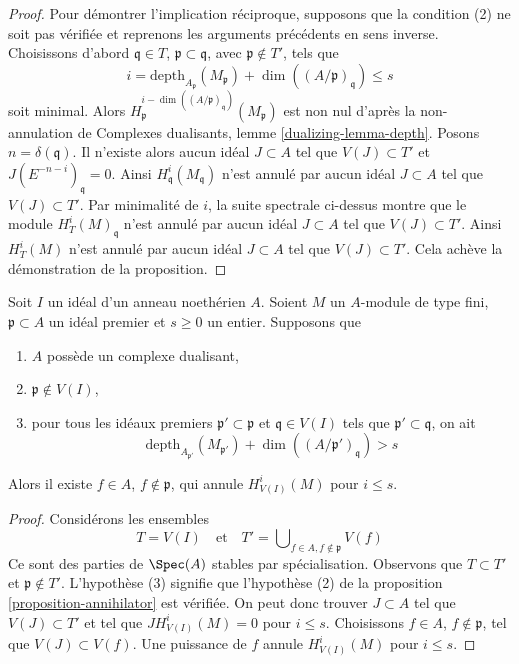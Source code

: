 \begin{proof}
\medskip\noindent
Pour démontrer l'implication réciproque, supposons que la condition (2) ne soit pas vérifiée et reprenons les arguments précédents en sens inverse. Choisissons d'abord $\mathfrak q \in T$, $\mathfrak p \subset \mathfrak q$, avec $\mathfrak p \not \in T'$, tels que
$$
i = \text{depth}_{A_\mathfrak p}(M_\mathfrak p) +
\dim((A/\mathfrak p)_\mathfrak q) \leq s
$$
soit minimal. Alors $H^{i - \dim((A/\mathfrak p)_\mathfrak q)}_\mathfrak p(M_\mathfrak p)$ est non nul d'après la non-annulation de Complexes dualisants, lemme \ref{dualizing-lemma-depth}. Posons $n = \delta(\mathfrak q)$. Il n'existe alors aucun idéal $J \subset A$ tel que $V(J) \subset T'$ et $J(E^{-n - i})_\mathfrak q = 0$. Ainsi $H^i_\mathfrak q(M_\mathfrak q)$ n'est annulé par aucun idéal $J \subset A$ tel que $V(J) \subset T'$. Par minimalité de $i$, la suite spectrale ci-dessus montre que le module $H^i_T(M)_\mathfrak q$ n'est annulé par aucun idéal $J \subset A$ tel que $V(J) \subset T'$. Ainsi $H^i_T(M)$ n'est annulé par aucun idéal $J \subset A$ tel que $V(J) \subset T'$. Cela achève la démonstration de la proposition.
\end{proof}

\begin{lemma}
\label{lemma-kill-local-cohomology-at-prime}
Soit $I$ un idéal d'un anneau noethérien $A$. Soient $M$ un $A$-module de type fini, $\mathfrak p \subset A$ un idéal premier et $s \geq 0$ un entier. Supposons que
\begin{enumerate}
\item $A$ possède un complexe dualisant,
\item $\mathfrak p \not \in V(I)$,
\item pour tous les idéaux premiers $\mathfrak p' \subset \mathfrak p$ et $\mathfrak q \in V(I)$ tels que $\mathfrak p' \subset \mathfrak q$, on ait
$$
\text{depth}_{A_{\mathfrak p'}}(M_{\mathfrak p'}) +
\dim((A/\mathfrak p')_\mathfrak q) > s
$$
\end{enumerate}
Alors il existe $f \in A$, $f \not \in \mathfrak p$, qui annule $H^i_{V(I)}(M)$ pour $i \leq s$.
\end{lemma}

\begin{proof}
Considérons les ensembles
$$
T = V(I)
\quad\text{et}\quad
T' = \bigcup\nolimits_{f \in A, f \not \in \mathfrak p} V(f)
$$
Ce sont des parties de $\Spec(A)$ stables par spécialisation. Observons que $T \subset T'$ et $\mathfrak p \not \in T'$. L'hypothèse (3) signifie que l'hypothèse (2) de la proposition \ref{proposition-annihilator} est vérifiée. On peut donc trouver $J \subset A$ tel que $V(J) \subset T'$ et tel que $J H^i_{V(I)}(M) = 0$ pour $i \leq s$. Choisissons $f \in A$, $f \not \in \mathfrak p$, tel que $V(J) \subset V(f)$. Une puissance de $f$ annule $H^i_{V(I)}(M)$ pour $i \leq s$.
\end{proof}





